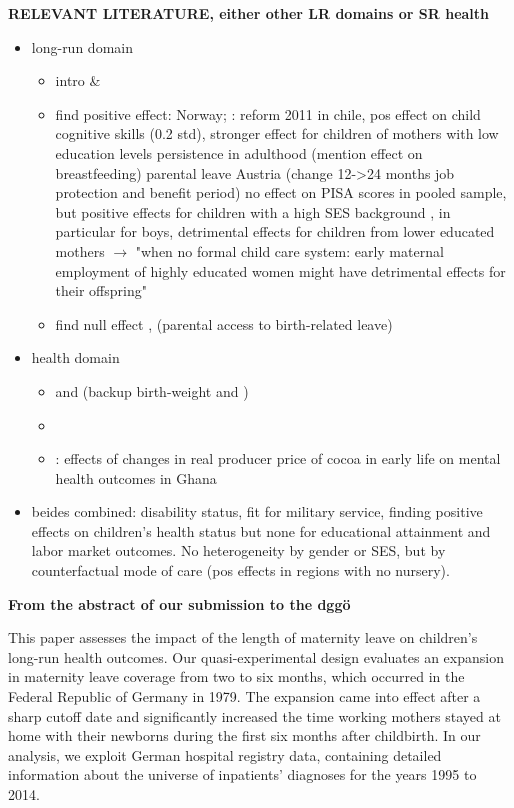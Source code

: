 \documentclass[11pt, a4paper]{article} %
\begin{document}
\textbf{RELEVANT LITERATURE, either other LR domains or SR health} 
\begin{itemize}
	\item long-run domain
	\begin{itemize}
		\item intro \cite{currie2011human} \& \cite{almond2017childhood}
		\item find positive effect: \cite{carneiro2015flying} Norway; \cite{albagli2018}: reform 2011 in chile, pos effect on child cognitive skills (0.2 std), stronger effect for children of mothers with low education levels persistence in adulthood (mention effect on breastfeeding)  \cite{danzer2017} parental leave Austria (change 12->24 months job protection and benefit period) no effect on PISA scores in pooled sample, but positive effects for children with a high SES background , in particular for boys, detrimental effects for children from lower educated mothers $\rightarrow$ "when no formal  child care system: early maternal employment of highly educated women might have detrimental effects for their offspring"
		\item find null effect \cite{Dahl2016Case}, \cite{rasmussen2010increasing} (parental access to birth-related leave)
	\end{itemize}
	\item health domain
	\begin{itemize}
		\item \cite{stearns2015effects} and \cite{rossin2011effects} (backup birth-weight \cite{almond2005costs} and \cite{currie2007biology})
		\item \cite{beuchert2016}
		\item \cite{adhvaryu2018early}: effects of changes in real producer price of cocoa in early life on mental health outcomes in Ghana
	\end{itemize}
	\item beides combined: \cite{danzer2017parental} disability status, fit for military service, finding positive effects on children's health status but none for educational attainment and labor market outcomes. No heterogeneity by gender or SES, but by counterfactual mode of care (pos effects in regions with no nursery).
\end{itemize}

\newpage 
\textbf{From the abstract of our submission to the dggö}

This paper assesses the impact of the length of maternity leave on children’s long-run health outcomes. Our quasi-experimental design evaluates an expansion in maternity leave coverage from two to six months, which occurred in the Federal Republic of Germany in 1979. The expansion came into effect after a sharp cutoff date and significantly increased the time working mothers stayed at home with their newborns during the first six months after childbirth. In our analysis, we exploit German hospital registry data, containing detailed information about the universe of inpatients' diagnoses for the years 1995 to 2014. \newline
\end{document}
